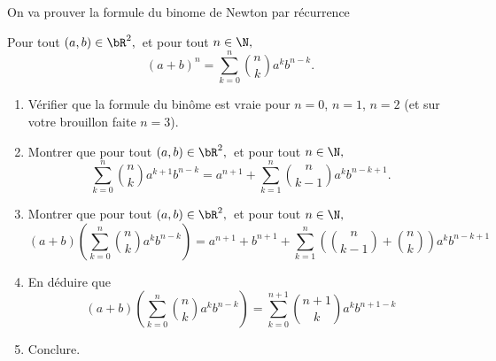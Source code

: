 \documentclass[a4paper, 11pt,reqno]{article}
\begin{document}
\begin{exercice}
On va prouver la formule du binome de Newton par récurrence 

Pour tout $(a,b)\in \bR^2,\, $ et pour tout $n \in \N,$ $$(a+b)^n =\sum_{k=0}^n \binom{n}{k}a^k b^{n-k}.$$


\begin{enumerate}
%

\item Vérifier que la formule du binôme est vraie pour $n=0$, $n=1$, $n=2$ (et sur votre brouillon faite $n=3$).

\item Montrer que pour tout $(a,b)\in \bR^2,\, $ et pour tout $n \in \N,$
$$\sum_{k=0}^n \binom{n}{k}a^{k+1} b^{n-k} = a^{n+1}+\sum_{k=1}^{n} \binom{n}{k-1}a^{k} b^{n-k+1}.$$


\item Montrer que pour tout $(a,b)\in \bR^2,\, $ et pour tout $n \in \N,$
$$(a+b)\left( \sum_{k=0}^n \binom{n}{k}a^k b^{n-k}\right) = a^{n+1}+b^{n+1}+\sum_{k=1}^{n} \left( \binom{n}{k-1}+\binom{n}{k}\right)a^{k} b^{n-k+1}$$

\item En déduire que 
$$(a+b)\left( \sum_{k=0}^n \binom{n}{k}a^k b^{n-k}\right) = \sum_{k=0}^{n+1}  \binom{n+1}{k}a^{k} b^{n+1-k}$$

\item Conclure. 




\end{enumerate}



\end{exercice}
\end{document}
